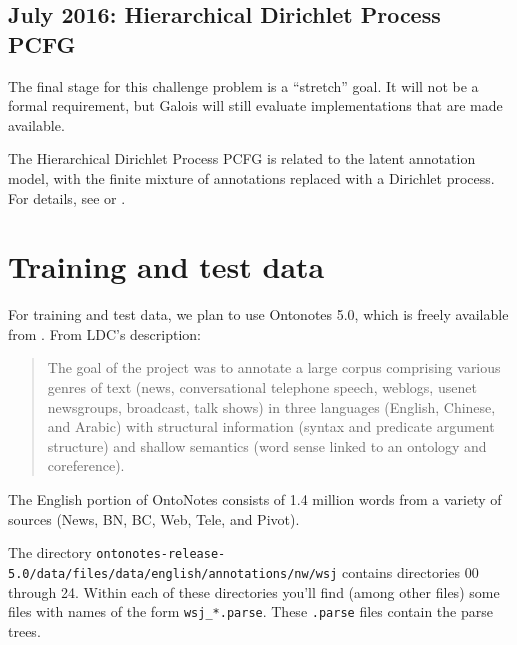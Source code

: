 \documentclass[english]{article}
\begin{document}
\subsection{July 2016: Hierarchical Dirichlet Process PCFG}

The final stage for this challenge problem is a ``stretch'' goal. It will not be a formal requirement, but Galois will still evaluate implementations that are made available.

The Hierarchical Dirichlet Process PCFG is related to the latent annotation model, with the finite mixture of annotations replaced with a Dirichlet process. For details, see \citet{Liang2007} or \citet{Liang2009}.

\section{Training and test data}

For training and test data, we plan to use Ontonotes 5.0, which is freely available from \citet{LDC2013}. From LDC's description: 
\begin{quote}
The goal of the project was to annotate a large corpus comprising various genres of text (news, conversational telephone speech, weblogs, usenet newsgroups, broadcast, talk shows) in three languages (English, Chinese, and Arabic) with structural information (syntax and predicate argument structure) and shallow semantics (word sense linked to an ontology and coreference).
\end{quote}



The English portion of OntoNotes consists of 1.4 million words from a variety of sources (News, BN, BC, Web, Tele, and Pivot).

The directory \texttt{ontonotes-release-5.0/data/files/data/english/annotations/nw/wsj} contains directories 00 through 24. Within each of these directories you'll find (among other files) some files with names of the form \texttt{wsj\_*.parse}. These \texttt{.parse} files contain the parse trees. 
\end{document}
